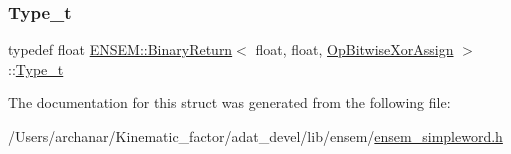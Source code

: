 \mbox{\label{structENSEM_1_1BinaryReturn_3_01float_00_01float_00_01OpBitwiseXorAssign_01_4_a6716df2454c53484524a0d243395b2ed}} 
\subsubsection{\texorpdfstring{Type\_t}{Type\_t}\hspace{0.1cm}{\footnotesize\ttfamily [2/2]}}
{\footnotesize\ttfamily typedef float \mbox{\hyperlink{structENSEM_1_1BinaryReturn}{E\+N\+S\+E\+M\+::\+Binary\+Return}}$<$ float, float, \mbox{\hyperlink{structENSEM_1_1OpBitwiseXorAssign}{Op\+Bitwise\+Xor\+Assign}} $>$\+::\mbox{\hyperlink{structENSEM_1_1BinaryReturn_3_01float_00_01float_00_01OpBitwiseXorAssign_01_4_a6716df2454c53484524a0d243395b2ed}{Type\+\_\+t}}}



The documentation for this struct was generated from the following file\+:\begin{DoxyCompactItemize}
\item 
/\+Users/archanar/\+Kinematic\+\_\+factor/adat\+\_\+devel/lib/ensem/\mbox{\hyperlink{lib_2ensem_2ensem__simpleword_8h}{ensem\+\_\+simpleword.\+h}}\end{DoxyCompactItemize}
